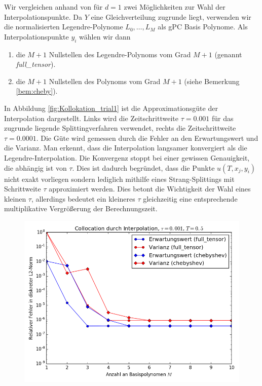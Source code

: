 \begin{mathbsp}
Wir vergleichen anhand von  für $d=1$ zwei Möglichkeiten zur Wahl der Interpolationspunkte. Da $Y$ eine Gleichverteilung zugrunde liegt, verwenden wir die normalisierten Legendre-Polynome $L_0,\dots,L_M$ als gPC Basis Polynome. Als Interpolationspunkte $y_i$ wählen wir dann
\begin{enumerate}
\item die $M+1$ Nullstellen des Legendre-Polynoms vom Grad $M+1$ (genannt \textit{full\_tensor}).
\item die $M+1$ Nullstellen des \chebyspace Polynoms vom Grad $M+1$ (siehe Bemerkung \ref{bem:cheby}).
\end{enumerate}
In Abbildung \ref{fig:Kollokation_trial1} ist die Approximationsgüte der Interpolation dargestellt. Links wird die Zeitschrittweite $\tau=0.001$ für das zugrunde liegende Splittingverfahren verwendet, rechts die Zeitschrittweite $\tau=0.0001$. Die Güte wird gemessen durch die Fehler an den Erwartungswert und die Varianz. Man erkennt, dass die \chebyspace Interpolation langsamer konvergiert als die Legendre-Interpolation. Die Konvergenz stoppt bei einer gewissen Genauigkeit, die abhängig ist von $\tau$. Dies ist dadurch begründet, dass die Punkte $u(T,x_j,y_i)$ nicht exakt vorliegen sondern lediglich mithilfe eines Strang-Splittings mit Schrittweite $\tau$ approximiert werden. Dies betont die Wichtigkeit der Wahl eines kleinen $\tau$, allerdings bedeutet ein kleineres $\tau$ gleichzeitig eine entsprechende multiplikative Vergrößerung der Berechnungszeit.
\begin{figure}[!htb]
  \includegraphics[width=\linewidth]{Figures/collocation_mi_trial1_tau001.png}

\end{figure}
\end{mathbsp}

